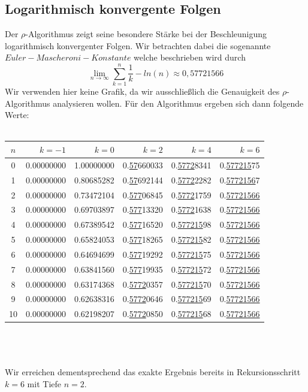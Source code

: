 \documentclass[a4paper,12pt]{article}
\numberwithin{equation}{section}
\theoremstyle{remark}
\begin{document}
\newpage
\subsection{Logarithmisch konvergente Folgen}\label{subsec:log}
Der $\rho$-Algorithmus zeigt seine besondere Stärke bei der Beschleunigung logarithmisch konvergenter Folgen. Wir betrachten dabei die sogenannte $Euler-Mascheroni-Konstante$ welche beschrieben wird durch
\[
\lim_{n \to \infty}\sum\limits_{k=1}^{n}\frac{1}{k}-ln(n) \approx0,57721566
\]
Wir verwenden hier keine Grafik, da wir ausschließlich die Genauigkeit des $\rho$-Algorithmus analysieren wollen. Für den Algorithmus ergeben sich dann folgende Werte:\\\\
\begin{tabular}{c|r|r|r|r|r}
$n$ & $k=-1$ & $k=0$ & $k=2$ & $k=4$ & $k=6$ \\
\hline
0 & 0.00000000 & 1.00000000 & 0.\underline{57}660033 & 0.\underline{5772}8341 & 0.\underline{577215}75 \\
1 & 0.00000000 & 0.80685282 & 0.\underline{57}692144 & 0.\underline{5772}2282 & 0.\underline{5772156}7 \\
2 & 0.00000000 & 0.73472104 & 0.\underline{577}06845 & 0.\underline{5772}1759 & 0.\underline{57721566} \\
3 & 0.00000000 & 0.69703897 & 0.\underline{577}13320 & 0.\underline{5772}1638 & 0.\underline{57721566} \\
4 & 0.00000000 & 0.67389542 & 0.\underline{577}16520 & 0.\underline{577215}98 & 0.\underline{57721566} \\
5 & 0.00000000 & 0.65824053 & 0.\underline{577}18265 & 0.\underline{577215}82 & 0.\underline{57721566} \\
6 & 0.00000000 & 0.64694699 & 0.\underline{577}19292 & 0.\underline{577215}75 & 0.\underline{57721566} \\
7 & 0.00000000 & 0.63841560 & 0.\underline{577}19935 & 0.\underline{577215}72 & 0.\underline{57721566} \\
8 & 0.00000000 & 0.63174368 & 0.\underline{5772}0357 & 0.\underline{577215}70 & 0.\underline{57721566} \\
9 & 0.00000000 & 0.62638316 & 0.\underline{5772}0646 & 0.\underline{577215}69 & 0.\underline{57721566} \\
10 & 0.00000000 & 0.62198207 & 0.\underline{5772}0850 & 0.\underline{577215}68 & 0.\underline{57721566} \\

\end{tabular}\\\\\\
Wir erreichen dementsprechend das exakte Ergebnis bereits in Rekursionsschritt $k=6$ mit Tiefe $n=2$.
\end{document}
